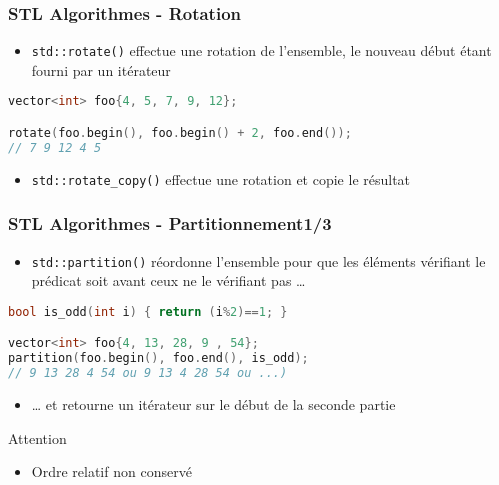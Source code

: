 \documentclass[C++.tex]{subfiles}
\begin{document}
\begin{frame}[fragile]
	\frametitle{STL Algorithmes - Rotation}
	\begin{itemize}
		\item \lstinline|std::rotate()| effectue une rotation de l'ensemble, le nouveau début étant fourni par un itérateur
	\end{itemize}

	\begin{lstlisting}[language=C++]
vector<int> foo{4, 5, 7, 9, 12};

rotate(foo.begin(), foo.begin() + 2, foo.end());
// 7 9 12 4 5\end{lstlisting}

	\begin{itemize}
		\item \lstinline|std::rotate_copy()| effectue une rotation et copie le résultat
	\end{itemize}
\end{frame}

\begin{frame}[fragile]
	\frametitle{STL Algorithmes - Partitionnement\titlehfill{}1/3}
	\begin{itemize}
		\item \lstinline|std::partition()| réordonne l'ensemble pour que les éléments vérifiant le prédicat soit avant ceux ne le vérifiant pas \ldots
	\end{itemize}

	\begin{lstlisting}[language=C++]
bool is_odd(int i) { return (i%2)==1; }

vector<int> foo{4, 13, 28, 9 , 54};
partition(foo.begin(), foo.end(), is_odd);
// 9 13 28 4 54 ou 9 13 4 28 54 ou ...)\end{lstlisting}


	\begin{itemize}
		\item \ldots{} et retourne un itérateur sur le début de la seconde partie
	\end{itemize}

	\begin{alertblock}{Attention}
		\begin{itemize}
			\item Ordre relatif non conservé
		\end{itemize}
	\end{alertblock}
\end{frame}
\end{document}
